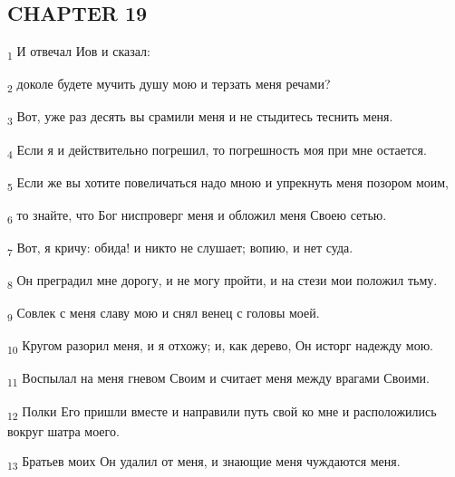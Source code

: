 \subsection{CHAPTER 19}
\begin{tcolorbox}
\textsubscript{1} И отвечал Иов и сказал:
\end{tcolorbox}
\begin{tcolorbox}
\textsubscript{2} доколе будете мучить душу мою и терзать меня речами?
\end{tcolorbox}
\begin{tcolorbox}
\textsubscript{3} Вот, уже раз десять вы срамили меня и не стыдитесь теснить меня.
\end{tcolorbox}
\begin{tcolorbox}
\textsubscript{4} Если я и действительно погрешил, то погрешность моя при мне остается.
\end{tcolorbox}
\begin{tcolorbox}
\textsubscript{5} Если же вы хотите повеличаться надо мною и упрекнуть меня позором моим,
\end{tcolorbox}
\begin{tcolorbox}
\textsubscript{6} то знайте, что Бог ниспроверг меня и обложил меня Своею сетью.
\end{tcolorbox}
\begin{tcolorbox}
\textsubscript{7} Вот, я кричу: обида! и никто не слушает; вопию, и нет суда.
\end{tcolorbox}
\begin{tcolorbox}
\textsubscript{8} Он преградил мне дорогу, и не могу пройти, и на стези мои положил тьму.
\end{tcolorbox}
\begin{tcolorbox}
\textsubscript{9} Совлек с меня славу мою и снял венец с головы моей.
\end{tcolorbox}
\begin{tcolorbox}
\textsubscript{10} Кругом разорил меня, и я отхожу; и, как дерево, Он исторг надежду мою.
\end{tcolorbox}
\begin{tcolorbox}
\textsubscript{11} Воспылал на меня гневом Своим и считает меня между врагами Своими.
\end{tcolorbox}
\begin{tcolorbox}
\textsubscript{12} Полки Его пришли вместе и направили путь свой ко мне и расположились вокруг шатра моего.
\end{tcolorbox}
\begin{tcolorbox}
\textsubscript{13} Братьев моих Он удалил от меня, и знающие меня чуждаются меня.
\end{tcolorbox}
